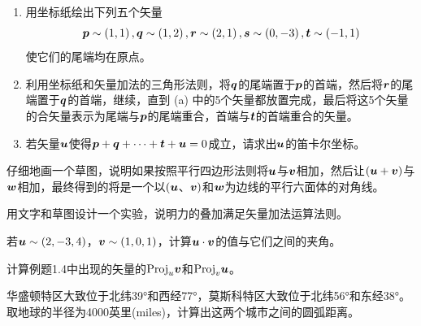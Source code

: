 \begin{exercise}
    \item \begin{enumerate}
        \item 用坐标纸绘出下列五个矢量
        \begin{equation*}
            \boldsymbol{p}\sim \left( 1,1 \right) ,\boldsymbol{q}\sim \left( 1,2 \right) ,\boldsymbol{r}\sim \left( 2,1 \right) ,\boldsymbol{s}\sim \left( 0,-3 \right) ,\boldsymbol{t}\sim \left( -1,1 \right) 
        \end{equation*}
        使它们的尾端均在原点。
        \item 利用坐标纸和矢量加法的三角形法则，将$\boldsymbol{q}$的尾端置于$\boldsymbol{p}$的首端，然后将$\boldsymbol{r}$的尾端置于$\boldsymbol{q}$的首端，继续，直到 (a) 中的5个矢量都放置完成，最后将这5个矢量的合矢量表示为尾端与$\boldsymbol{p}$的尾端重合，首端与$\boldsymbol{t}$的首端重合的矢量。
        \item 若矢量$\boldsymbol{u}$使得$\boldsymbol{p}+\boldsymbol{q}+\cdots +\boldsymbol{t}+\boldsymbol{u}=0$成立，请求出$\boldsymbol{u}$的笛卡尔坐标。
    \end{enumerate}
    \begin{figure}[htbp]
        \centering
        \hspace{1cm}
    \end{figure}
    \item 仔细地画一个草图，说明如果按照平行四边形法则将$\boldsymbol{u}$与$\boldsymbol{v}$相加，然后让$(\boldsymbol{u}+\boldsymbol{v})$与$\boldsymbol{w}$相加，最终得到的将是一个以$(\boldsymbol{u}$、$\boldsymbol{v})$和$\boldsymbol{w}$为边线的平行六面体的对角线。
    \item 用文字和草图设计一个实验，说明力的叠加满足矢量加法运算法则。
    \item 若$\boldsymbol{u}\sim (2,-3,4)$，$\boldsymbol{v}\sim (1,0,1)$，计算$\boldsymbol{u}\cdot \boldsymbol{v}$的值与它们之间的夹角。
    \item 计算例题1.4中出现的矢量的$\mathrm{Proj}_u\boldsymbol{v}$和$\mathrm{Proj}_v\boldsymbol{u}$。
    \item 华盛顿特区大致位于北纬39°和西经77°，莫斯科特区大致位于北纬56°和东经38°。取地球的半径为4000英里(miles)，计算出这两个城市之间的圆弧距离。
    

\end{exercise}
